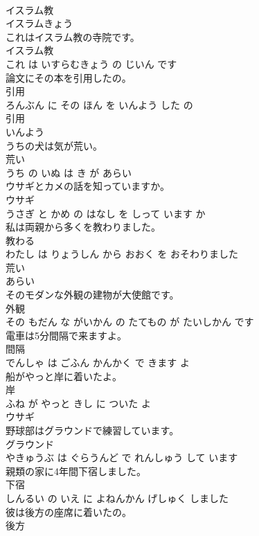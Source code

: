 \documentclass[8pt]{extreport}
\begin{document}
\begin{CJK}{UTF8}{min}
\\	イスラム教	
\\	イスラムきょう			
\\	これはイスラム教の寺院です。	
\\	イスラム教 
\\	これ は いすらむきょう の じいん です			
\\	論文にその本を引用したの。	
\\	引用 
\\	ろんぶん に その ほん を いんよう した の			
\\	引用	
\\	いんよう			
\\	うちの犬は気が荒い。	
\\	荒い 
\\	うち の いぬ は き が あらい			
\\	ウサギとカメの話を知っていますか。	
\\	ウサギ 
\\	うさぎ と かめ の はなし を しって います か			
\\	私は両親から多くを教わりました。	
\\	教わる 
\\	わたし は りょうしん から おおく を おそわりました			
\\	荒い	
\\	あらい			
\\	そのモダンな外観の建物が大使館です。	
\\	外観 
\\	その もだん な がいかん の たてもの が たいしかん です			
\\	電車は5分間隔で来ますよ。	
\\	間隔 
\\	でんしゃ は ごふん かんかく で きます よ			
\\	船がやっと岸に着いたよ。	
\\	岸 
\\	ふね が やっと きし に ついた よ			
\\	ウサギ	
\\	野球部はグラウンドで練習しています。	
\\	グラウンド 
\\	やきゅうぶ は ぐらうんど で れんしゅう して います			
\\	親類の家に4年間下宿しました。	
\\	下宿 
\\	しんるい の いえ に よねんかん げしゅく しました			
\\	彼は後方の座席に着いたの。	
\\	後方 

\end{CJK}
\end{document}
